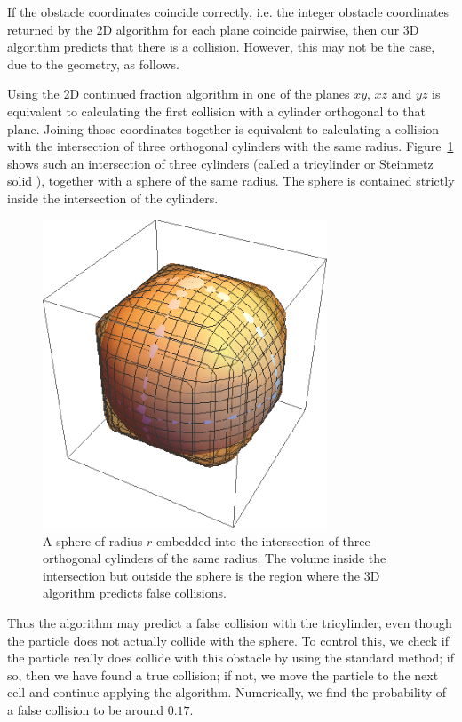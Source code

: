 \documentclass{iopart}
\begin{document}
If the obstacle coordinates coincide correctly, i.e. the integer obstacle coordinates returned by the 2D algorithm for each plane coincide pairwise, then our 3D algorithm predicts that there is a collision. However, this may not be the case, due to the geometry, as follows.

Using the 2D continued fraction algorithm in one of the planes $xy$, $xz$ and $yz$ is equivalent to calculating the first collision with a cylinder orthogonal 
to that plane. Joining those coordinates together is equivalent to calculating a collision with the intersection of three orthogonal cylinders with the same radius. 
Figure~\ref{fig:collision} shows such an intersection of three cylinders (called a tricylinder or Steinmetz solid \cite{tricylinder1974}), together with a sphere of the same radius. The sphere is contained strictly inside the intersection of the cylinders. 
 
\begin{figure}
\centering
\includegraphics [width=240pt]{./region.png}
\caption{A sphere of radius $r$ embedded into the intersection of three orthogonal cylinders of the same radius. The volume inside the intersection but outside the sphere is the region where the 3D algorithm predicts false collisions.}
\label{fig:collision}
\end{figure}
 


Thus the algorithm may predict a false collision with the tricylinder, even though the particle does not actually collide with the sphere. To control this, we check if the particle really does collide with this obstacle by using the standard method; if so, then we have found a true collision; if not, we move the particle to the next cell and continue applying the algorithm. 
Numerically, we find the probability of a false collision to be around $0.17$. 
% 
\end{document}

